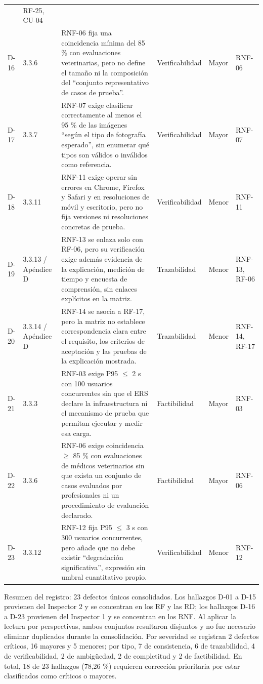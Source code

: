 \documentclass[journal,onecolumn]{IEEEtran}
\begin{document}
\begin{longtable}{C{1.0cm} L{2.0cm} L{4.6cm} L{1.9cm} L{1.7cm} L{1.8cm}}
		& RF-25, CU-04 \\
		\addlinespace
		D-16 & 3.3.6 &
		RNF-06 fija una coincidencia mínima del 85 \% con evaluaciones veterinarias, pero no define el
		tamaño ni la composición del ``conjunto representativo de casos de prueba''. &
		Verificabilidad & Mayor & RNF-06 \\
		\addlinespace
		D-17 & 3.3.7 &
		RNF-07 exige clasificar correctamente al menos el 95 \% de las imágenes ``según el tipo de
		fotografía esperado'', sin enumerar qué tipos son válidos o inválidos como referencia. &
		Verificabilidad & Mayor & RNF-07 \\
		\addlinespace
		D-18 & 3.3.11 &
		RNF-11 exige operar sin errores en Chrome, Firefox y Safari y en resoluciones de móvil y
		escritorio, pero no fija versiones ni resoluciones concretas de prueba. & Verificabilidad &
		Menor & RNF-11 \\
		\addlinespace
		D-19 & 3.3.13 / Apéndice D &
		RNF-13 se enlaza solo con RF-06, pero su verificación exige además evidencia de la
		explicación, medición de tiempo y encuesta de comprensión, sin enlaces explícitos en la
		matriz. & Trazabilidad & Menor & RNF-13, RF-06 \\
		\addlinespace
		D-20 & 3.3.14 / Apéndice D &
		RNF-14 se asocia a RF-17, pero la matriz no establece correspondencia clara entre el
		requisito, los criterios de aceptación y las pruebas de la explicación mostrada. &
		Trazabilidad & Menor & RNF-14, RF-17 \\
		\addlinespace
		D-21 & 3.3.3 &
		RNF-03 exige P95 $\leq$ 2 s con 100 usuarios concurrentes sin que el ERS declare la
		infraestructura ni el mecanismo de prueba que permitan ejecutar y medir esa carga. &
		Factibilidad & Mayor & RNF-03 \\
		\addlinespace
		D-22 & 3.3.6 &
		RNF-06 exige coincidencia $\geq$ 85 \% con evaluaciones de médicos veterinarios sin que exista
		un conjunto de casos evaluados por profesionales ni un procedimiento de evaluación declarado.
		& Factibilidad & Mayor & RNF-06 \\
		\addlinespace
		D-23 & 3.3.12 &
		RNF-12 fija P95 $\leq$ 3 s con 300 usuarios concurrentes, pero añade que no debe existir
		``degradación significativa'', expresión sin umbral cuantitativo propio. & Verificabilidad &
		Menor & RNF-12 \\
	\end{longtable}
	
	Resumen del registro: 23 defectos únicos consolidados. Los hallazgos D-01 a D-15 provienen del
	Inspector 2 y se concentran en los RF y las RD; los hallazgos D-16 a D-23 provienen del Inspector
	1 y se concentran en los RNF. Al aplicar la lectura por perspectivas, ambos conjuntos resultaron
	disjuntos y no fue necesario eliminar duplicados durante la consolidación. Por severidad se
	registran 2 defectos críticos, 16 mayores y 5 menores; por tipo, 7 de consistencia, 6 de
	trazabilidad, 4 de verificabilidad, 2 de ambigüedad, 2 de completitud y 2 de factibilidad. En
	total, 18 de 23 hallazgos (78,26 \%) requieren corrección prioritaria por estar clasificados como
	críticos o mayores.
	
\end{document}
